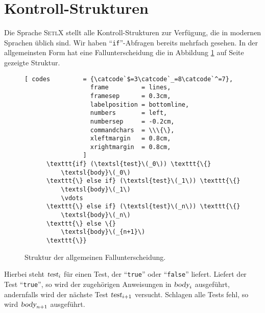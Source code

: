 \section{Kontroll-Strukturen}
Die Sprache \textsc{SetlX} stellt alle Kontroll-Strukturen zur Verf\"{u}gung, die
 in modernen Sprachen \"{u}blich sind.  Wir haben  ``\texttt{if}''-Abfragen bereits mehrfach gesehen.
In der  allgemeinsten Form hat eine Fallunterscheidung die in Abbildung \ref{fig:if} auf Seite
\pageref{fig:if} gezeigte Struktur.
\begin{figure}[!ht]
\begin{Verbatim}[ codes         = {\catcode`$=3\catcode`_=8\catcode`^=7},
                  frame         = lines, 
                  framesep      = 0.3cm, 
                  labelposition = bottomline,
                  numbers       = left,
                  numbersep     = -0.2cm,
                  commandchars  = \\\{\},
                  xleftmargin   = 0.8cm,
                  xrightmargin  = 0.8cm,
                ]
      \texttt{if} (\textsl{test}\(_0\)) \texttt{\{}
          \textsl{body}\(_0\)
      \texttt{\} else if} (\textsl{test}\(_1\)) \texttt{\{}
          \textsl{body}\(_1\)
          \vdots
      \texttt{\} else if} (\textsl{test}\(_n\)) \texttt{\{}
          \textsl{body}\(_n\)
      \texttt{\} else \{}
          \textsl{body}\(_{n+1}\)
      \texttt{\}}
\end{Verbatim} 
\vspace*{-0.3cm}
\caption{Struktur der allgemeinen Fallunterscheidung.}  
\label{fig:if}
\end{figure} %


Hierbei steht $\textsl{test}_i$ f\"{u}r einen Test, der ``\texttt{true}'' oder
``\texttt{false}'' liefert.  Liefert der Test ``\texttt{true}'', so wird der zugeh\"{o}rigen
Anweisungen in $\textsl{body}_i$ ausgef\"{u}hrt, andernfalls wird der n\"{a}chste
Test  $\textsl{test}_{i+1}$ versucht.  Schlagen alle Tests fehl, so wird
$\textsl{body}_{n+1}$ ausgef\"{u}hrt.
 
